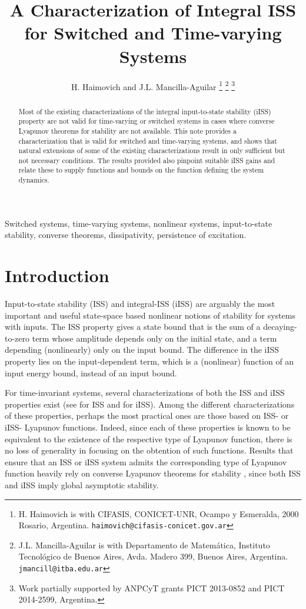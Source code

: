 \documentclass[9pt,final,journal]{IEEEtran}
\title{A Characterization of Integral ISS\\ for Switched and Time-varying Systems}
\author{H. Haimovich and J.L. Mancilla-Aguilar  
 \thanks{H. Haimovich is with CIFASIS, CONICET-UNR, Ocampo y Esmeralda, 2000 Rosario, Argentina. {\texttt{haimovich@cifasis-conicet.gov.ar}}}%
\thanks{J.L. Mancilla-Aguilar is with Departamento de Matem\'atica, Instituto Tecnol\'ogico de Buenos Aires, Avda. Madero 399, Buenos Aires, Argentina. \texttt{jmancill@itba.edu.ar}}
\thanks{Work partially supported by ANPCyT grants PICT 2013-0852 and PICT 2014-2599, Argentina.}%
}
\begin{document}
\maketitle

\begin{abstract}
  Most of the existing characterizations of the integral input-to-state stability (iISS) property are not valid for time-varying or switched systems in cases where converse Lyapunov theorems for stability are not available. This note provides a characterization that is valid for switched and time-varying systems, and shows that natural extensions of some of the existing characterizations result in only sufficient but not necessary conditions. The results provided also pinpoint suitable iISS gains and relate these to supply functions and bounds on the function defining the system dynamics.
\end{abstract}

\begin{keywords}
  Switched systems, time-varying systems, nonlinear systems, input-to-state stability, converse theorems, dissipativity, persistence of excitation.
\end{keywords}

\section{Introduction}
\label{sec:introduction}

Input-to-state stability (ISS) \cite{sontag_tac89} and integral-ISS (iISS) \cite{sontag_scl98} are arguably the most important and useful state-space based nonlinear notions of stability for systems with inputs. The ISS property gives a state bound that is the sum of a decaying-to-zero term whose amplitude depends only on the initial state, and a term depending (nonlinearly) only on the input bound. The difference in the iISS property lies on the input-dependent term, which is a (nonlinear) function of an input energy bound, instead of an input bound.

For time-invariant systems, several characterizations of both the ISS and iISS properties exist (see \cite{sonwan_scl95,sonwan_tac96,libshi_tac15} for ISS and \cite{sontag_scl98,angson_tac00,angson_dc00} for iISS). Among the different characterizations of these properties, perhaps the most practical ones are those based on ISS- \cite{sonwan_scl95} or iISS- \cite{angson_tac00} Lyapunov functions. Indeed, since each of these properties is known to be equivalent to the existence of the respective type of Lyapunov function, there is no loss of generality in focusing on the obtention of such functions. 
Results that ensure that an ISS or iISS system admits the corresponding type of Lyapunov function heavily rely on converse Lyapunov theorems for stability \cite{linson_jco96}, since both ISS and iISS imply global asymptotic stability. 
\end{document}
